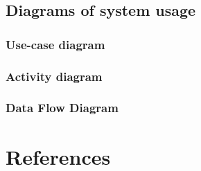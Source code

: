 \documentclass{article}
\begin{document}
\subsection{Diagrams of system usage}
\subsubsection{Use-case diagram}
\subsubsection{Activity diagram}
\subsubsection{Data Flow Diagram}

\newpage
\section{References}
\end{document}
